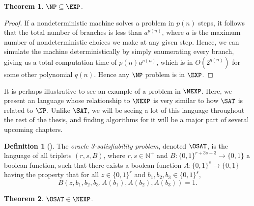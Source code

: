 \documentclass[english,12pt]{reedthesis}
\theoremstyle{plain}
\newtheorem{thm}{Theorem}[section]
\theoremstyle{definition}
\newtheorem{defn}[defn]{Definition}
\theoremstyle{remark}
\begin{document}
\begin{thm}\label{thm:np-exp}
  $\NP \subseteq \EXP$.
\end{thm}

\begin{proof}
  If a nondeterministic machine solves a problem in $p(n)$ steps, it follows
  that the total number of branches is less than $a^{p(n)}$, where $a$ is the
  maximum number of nondeterministic choices we make at any given step. Hence,
  we can simulate the machine deterministically by simply enumerating every
  branch, giving us a total computation time of $p(n)a^{p(n)}$, which is in
  $O(2^{q(n)})$ for some other polynomial $q(n)$. Hence any $\NP$ problem is in
  $\EXP$.
\end{proof}

It is perhaps illustrative to see an example of a problem in $\NEXP$. Here, we
present an language whose relationship to $\NEXP$ is very similar to how $\SAT$
is related to $\NP$. Unlike $\SAT$, we will be seeing a lot of this language
throughout the rest of the thesis, and finding algorithms for it will be a major
part of several upcoming chapters.

\begin{defn}[{\cite[Def.\ 14.1]{CFGS22}}]\label{def:oracle-3sat}
  The \emph{oracle 3-satisfiability problem}, denoted $\OSAT$, is the language
  of all triplets $(r, s, B)$, where $r, s \in \mathbb{N}^{+}$ and
  $B\colon \{0, 1\}^{r+3s+3} \rightarrow \{0, 1\}$ a boolean function, such that there
  exists a boolean function $A\colon \{0, 1\}^{s} \rightarrow \{0, 1\}$ having
  the property that for all $z \in \{0, 1\}^{r}$ and
  $b_{1}, b_{2}, b_{3} \in \{0, 1\}^{s}$,
  \begin{equation*}
    B(z, b_{1}, b_{2}, b_{3}, A(b_{1}), A(b_{2}), A(b_{3})) = 1.
  \end{equation*}
\end{defn}

\begin{thm}\label{thm:o3sat-in-nexp}
  $\OSAT \in \NEXP$.
\end{thm}
\end{document}
